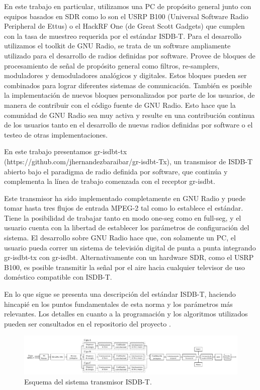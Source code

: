 \documentclass[journal,comsoc]{IEEEtran}
\begin{document}
En este trabajo en particular, utilizamos una PC de propósito general junto con equipos basados en SDR como lo son el USRP B100 (Universal Software Radio Peripheral de Ettus)\cite{b100} o el HackRF One (de Great Scott Gadgets) \cite{GreatScottGadgets} que cumplen con la tasa de muestreo requerida por el estándar ISDB-T.
Para el desarrollo utilizamos el toolkit de GNU Radio, se trata de un software ampliamente utilizado para el desarrollo de radios definidas por software. Provee de bloques de procesamiento de señal de propósito general como filtros, re-samplers, moduladores y demoduladores analógicos y digitales. Estos bloques pueden ser combinados para lograr diferentes sistemas de comunicación. También es posible la implementación de nuevos bloques personalizados por parte de los usuarios, de manera de contribuir con el código fuente de GNU Radio. Esto hace que la comunidad de GNU Radio sea muy activa y resulte en una contribución continua de los usuarios tanto en el desarrollo de nuevas radios definidas por software o el testeo de otras implementaciones.

En este trabajo presentamos gr-isdbt-tx (https://github.com/jhernandezbaraibar/gr-isdbt-Tx), un transmisor de ISDB-T abierto bajo el paradigma de radio definida por software, que continúa y complementa la línea de trabajo comenzada con el receptor gr-isdbt. 

Este transmisor ha sido implementado completamente en GNU Radio y puede tomar hasta tres flujos de entrada MPEG-2 tal como lo establece el estándar. Tiene la posibilidad de trabajar tanto en modo one-seg como en full-seg, y el usuario cuenta con la libertad de establecer los parámetros de configuración del sistema. El desarrollo sobre GNU Radio hace que, con solamente un PC, el usuario pueda correr un sistema de televisión digital de punta a punta integrando gr-isdbt-tx con gr-isdbt. Alternativamente con un hardware SDR, como el USRP B100, es posible transmitir la señal por el aire hacia cualquier televisor de uso doméstico compatible con ISDB-T.

En lo que sigue se presenta una descripción del estándar ISDB-T, haciendo hincapié en los puntos fundamentales de esta norma y los parámetros más relevantes. Los detalles en cuanto a la programación y los algoritmos utilizados pueden ser consultados en el repositorio del proyecto \cite{gr-isdbt-tx}.


\begin{figure}[!h]
\centering
\includegraphics[width=7.1in]{figuras/esquema-tx}
\caption{Esquema del sistema transmisor ISDB-T.}
\label{esquema-tx}
\end{figure}
\end{document}
